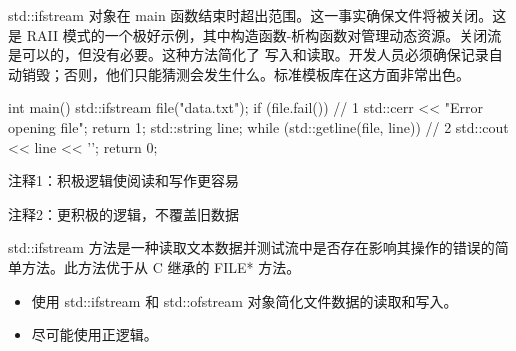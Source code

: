 std::ifstream 对象在 main 函数结束时超出范围。这一事实确保文件将被关闭。这是 RAII 模式的一个极好示例，其中构造函数-析构函数对管理动态资源。关闭流是可以的，但没有必要。这种方法简化了 写入和读取。开发人员必须确保记录自动销毁；否则，他们只能猜测会发生什么。标准模板库在这方面非常出色。


\begin{cpp}
int main() {
  std::ifstream file("data.txt");
  if (file.fail()) { // 1
    std::cerr << "Error opening file\n";
    return 1;
  }
  std::string line;
  while (std::getline(file, line)) // 2
  std::cout << line << '\n';
  return 0;
}
\end{cpp}

{\footnotesize
注释1：积极逻辑使阅读和写作更容易

注释2：更积极的逻辑，不覆盖旧数据
}

std::ifstream 方法是一种读取文本数据并测试流中是否存在影响其操作的错误的简单方法。此方法优于从 C 继承的 FILE* 方法。


\begin{itemize}
\item
使用 std::ifstream 和 std::ofstream 对象简化文件数据的读取和写入。

\item
尽可能使用正逻辑。
\end{itemize}


































